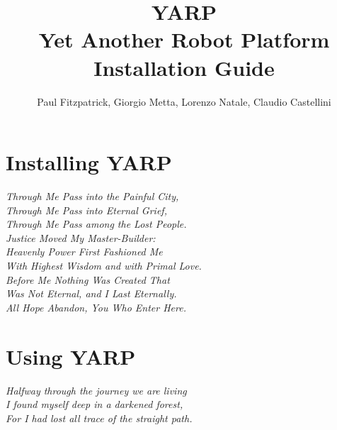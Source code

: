 \documentclass[a4paper]{report}
\begin{document}
\title{{\LARGE YARP}\\Yet Another Robot Platform\\
Installation Guide
}

\author{Paul Fitzpatrick, Giorgio Metta, Lorenzo Natale, Claudio Castellini}

\addtolength{\hoffset}{1cm}
\maketitle
\thispagestyle{empty}
\newpage

\tableofcontents

\newpage
\chapter{Installing YARP}
\begin{flushright}
\textit{
          Through Me Pass into the Painful City, \\
          Through Me Pass into Eternal Grief, \\
          Through Me Pass among the Lost People. \\ 
          Justice Moved My Master-Builder: \\
          Heavenly Power First Fashioned Me \\
          With Highest Wisdom and with Primal Love. \\
          Before Me Nothing Was Created That  \\
          Was Not Eternal, and I Last Eternally. \\ 
          All Hope Abandon, You Who Enter Here. \\
        }
\end{flushright}

\newpage
\addtolength{\hoffset}{-1cm}




\newpage
\chapter{Using YARP}
\label {chapter:usage}
\begin{flushright}
\textit{
					Halfway through the journey we are living \\
          I found myself deep in a darkened forest, \\
          For I had lost all trace of the straight path. \\
       }
\end{flushright}
\addtolength{\hoffset}{1cm}
\end{document}
